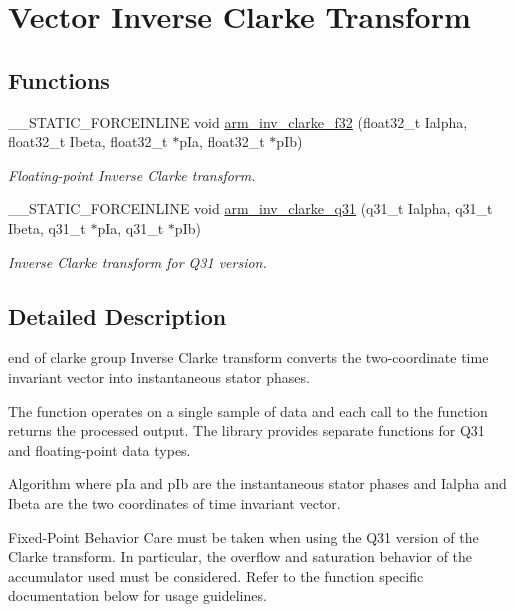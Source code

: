 \hypertarget{group__inv__clarke}{}\section{Vector Inverse Clarke Transform}
\label{group__inv__clarke}
\subsection*{Functions}
\begin{DoxyCompactItemize}
\item 
\+\_\+\+\_\+\+S\+T\+A\+T\+I\+C\+\_\+\+F\+O\+R\+C\+E\+I\+N\+L\+I\+NE void \mbox{\hyperlink{group__inv__clarke_ga1a73ce96f94b2124d02426690e587197}{arm\+\_\+inv\+\_\+clarke\+\_\+f32}} (float32\+\_\+t Ialpha, float32\+\_\+t Ibeta, float32\+\_\+t $\ast$p\+Ia, float32\+\_\+t $\ast$p\+Ib)
\begin{DoxyCompactList}\small\item\em Floating-\/point Inverse Clarke transform. \end{DoxyCompactList}\item 
\+\_\+\+\_\+\+S\+T\+A\+T\+I\+C\+\_\+\+F\+O\+R\+C\+E\+I\+N\+L\+I\+NE void \mbox{\hyperlink{group__inv__clarke_ga3bab178431f22d13332a0dfae4390172}{arm\+\_\+inv\+\_\+clarke\+\_\+q31}} (q31\+\_\+t Ialpha, q31\+\_\+t Ibeta, q31\+\_\+t $\ast$p\+Ia, q31\+\_\+t $\ast$p\+Ib)
\begin{DoxyCompactList}\small\item\em Inverse Clarke transform for Q31 version. \end{DoxyCompactList}\end{DoxyCompactItemize}


\subsection{Detailed Description}
end of clarke group Inverse Clarke transform converts the two-\/coordinate time invariant vector into instantaneous stator phases.

The function operates on a single sample of data and each call to the function returns the processed output. The library provides separate functions for Q31 and floating-\/point data types. \begin{DoxyParagraph}{Algorithm}
 where {\ttfamily p\+Ia} and {\ttfamily p\+Ib} are the instantaneous stator phases and {\ttfamily Ialpha} and {\ttfamily Ibeta} are the two coordinates of time invariant vector. 
\end{DoxyParagraph}
\begin{DoxyParagraph}{Fixed-\/\+Point Behavior}
Care must be taken when using the Q31 version of the Clarke transform. In particular, the overflow and saturation behavior of the accumulator used must be considered. Refer to the function specific documentation below for usage guidelines. 
\end{DoxyParagraph}


